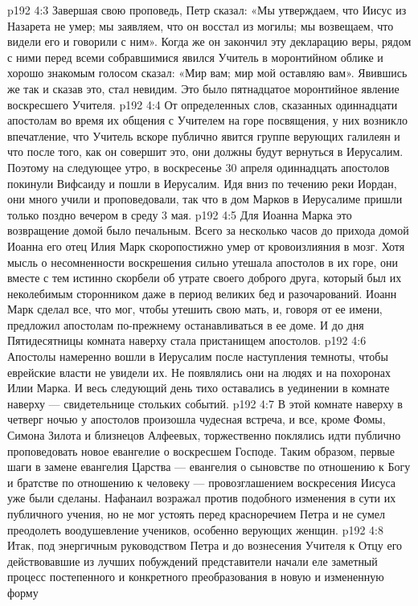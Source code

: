 \vs p192 4:3 Завершая свою проповедь, Петр сказал: «Мы утверждаем, что Иисус из Назарета не умер; мы заявляем, что он восстал из могилы; мы возвещаем, что видели его и говорили с ним». Когда же он закончил эту декларацию веры, рядом с ними перед всеми собравшимися явился Учитель в моронтийном облике и хорошо знакомым голосом сказал: «Мир вам; мир мой оставляю вам». Явившись же так и сказав это, стал невидим. Это было пятнадцатое моронтийное явление воскресшего Учителя.
\vs p192 4:4 \pc От определенных слов, сказанных одиннадцати апостолам во время их общения с Учителем на горе посвящения, у них возникло впечатление, что Учитель вскоре публично явится группе верующих галилеян и что после того, как он совершит это, они должны будут вернуться в Иерусалим. Поэтому на следующее утро, в воскресенье 30 апреля одиннадцать апостолов покинули Вифсаиду и пошли в Иерусалим. Идя вниз по течению реки Иордан, они много учили и проповедовали, так что в дом Марков в Иерусалиме пришли только поздно вечером в среду 3 мая.
\vs p192 4:5 \pc Для Иоанна Марка это возвращение домой было печальным. Всего за несколько часов до прихода домой Иоанна его отец Илия Марк скоропостижно умер от кровоизлияния в мозг. Хотя мысль о несомненности воскрешения сильно утешала апостолов в их горе, они вместе с тем истинно скорбели об утрате своего доброго друга, который был их неколебимым сторонником даже в период великих бед и разочарований. Иоанн Марк сделал все, что мог, чтобы утешить свою мать, и, говоря от ее имени, предложил апостолам по\hyp{}прежнему останавливаться в ее доме. И до дня Пятидесятницы комната наверху стала пристанищем апостолов.
\vs p192 4:6 \pc Апостолы намеренно вошли в Иерусалим после наступления темноты, чтобы еврейские власти не увидели их. Не появлялись они на людях и на похоронах Илии Марка. И весь следующий день тихо оставались в уединении в комнате наверху --- свидетельнице стольких событий.
\vs p192 4:7 В этой комнате наверху в четверг ночью у апостолов произошла чудесная встреча, и все, кроме Фомы, Симона Зилота и близнецов Алфеевых, торжественно поклялись идти публично проповедовать новое евангелие о воскресшем Господе. Таким образом, первые шаги в замене евангелия Царства --- евангелия о сыновстве по отношению к Богу и братстве по отношению к человеку --- провозглашением воскресения Иисуса уже были сделаны. Нафанаил возражал против подобного изменения в сути их публичного учения, но не мог устоять перед красноречием Петра и не сумел преодолеть воодушевление учеников, особенно верующих женщин.
\vs p192 4:8 Итак, под энергичным руководством Петра и до вознесения Учителя к Отцу его действовавшие из лучших побуждений представители начали еле заметный процесс постепенного и конкретного преобразования  в новую и измененную форму 
